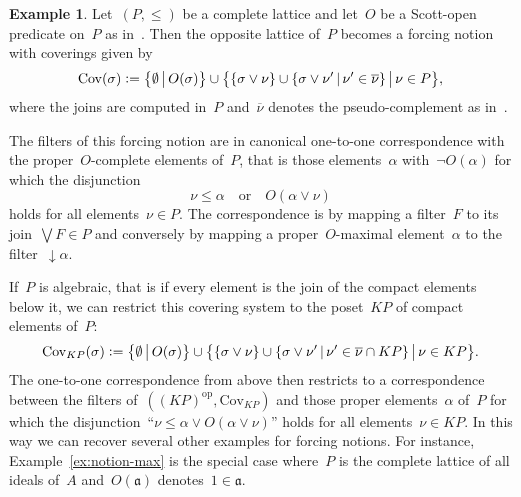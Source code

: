 \documentclass[com,11pt,crcready]{iosart2x}
\theoremstyle{definition}
\newtheorem{example}[definition]{Example}
\theoremstyle{plain}
\theoremstyle{remark}
\newcommand{\aaa}{\mathfrak{a}}
\newcommand{\defeq}{\vcentcolon=}
\newcommand{\Cov}{\mathrm{Cov}}
\renewcommand{\_}{\mathpunct{.}\,}
\begin{document}
\begin{example}\label{ex:notion-scott}Let~$(P,{\leq})$ be a complete lattice and let~$O$
be a Scott-open predicate on~$P$ as in~\cite{wessel-schuster:radical}. Then the
opposite lattice of~$P$ becomes a forcing notion with coverings given by
\[
  \Cov(\sigma) \defeq \bigl\{ \emptyset \,\big|\, O(\sigma) \bigr\} \cup
    \bigl\{ \{ \sigma \vee \nu \} \cup \{ \sigma \vee \nu' \,|\, \nu' \in
    \overline{\nu} \} \,\big|\, \nu \in P \bigr\},
\]
where the joins are computed in~$P$ and~$\overline{\nu}$ denotes the pseudo-complement as
in~\cite[Equation~(6)]{wessel-schuster:radical}.

The filters of this forcing notion are in canonical one-to-one correspondence with
the proper~$O$-complete elements of~$P$, that is those elements~$\alpha$
with~$\neg O(\alpha)$ for which the disjunction
\[ \nu \leq \alpha \quad\text{or}\quad O(\alpha \vee \nu) \]
holds for all elements~$\nu \in P$. The correspondence is by mapping a
filter~$F$ to its join~$\bigvee F \in P$ and conversely by mapping
a proper~$O$-maximal element~$\alpha$ to the filter~${\downarrow}\alpha$.

If~$P$ is algebraic, that is if every element is the join of the compact
elements below it, we can restrict this covering system to the poset~$KP$ of
compact elements of~$P$:
\[
  \Cov_{KP}(\sigma) \defeq \bigl\{ \emptyset \,\big|\, O(\sigma) \bigr\} \cup
    \bigl\{ \{ \sigma \vee \nu \} \cup \{ \sigma \vee \nu' \,|\, \nu' \in
    \overline{\nu} \cap KP \} \,\big|\, \nu \in KP \bigr\}.
\]
The one-to-one correspondence from above then restricts to a correspondence
between the filters of~$((KP)^\mathrm{op},\mathrm{Cov}_{KP})$ and those proper
elements~$\alpha$ of~$P$ for which the disjunction~``$\nu \leq \alpha \vee
O(\alpha \vee \nu)$'' holds for all elements~$\nu \in KP$. In this way we can
recover several other examples for forcing notions. For instance,
Example~\ref{ex:notion-max} is the special case where~$P$ is the complete lattice
of all ideals of~$A$ and~$O(\aaa)$ denotes~$1 \in \aaa$.
\end{example}
\end{document}
